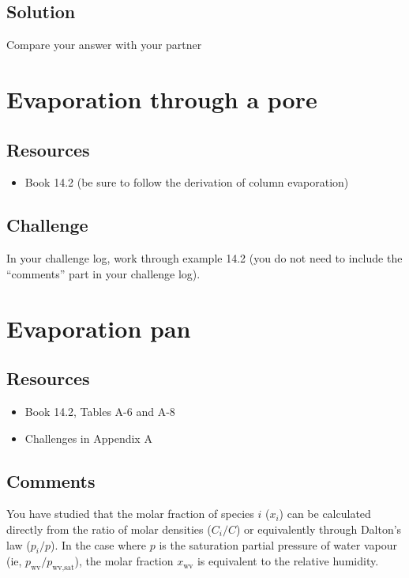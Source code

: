 \subsection*{Solution}
Compare your answer with your partner




\newpage
\section{Evaporation through a pore}

\subsection*{Resources}
\begin{itemize}
    \item Book 14.2 (be sure to follow the derivation of column evaporation)
\end{itemize}

\subsection*{Challenge}
In your challenge log, work through example 14.2 (you do not need to include the ``comments'' part in your challenge log).



\newpage
\section{Evaporation pan}

\subsection*{Resources}
\begin{itemize}
    \item Book 14.2, Tables A-6 and A-8
    \item Challenges in Appendix A
\end{itemize}

\subsection*{Comments}
You have studied that the molar fraction of species $i$ ($x_i$) can be calculated directly from the ratio of molar densities ($C_i/C$) or equivalently through Dalton's law ($p_i/p$). In the case where $p$ is the saturation partial pressure of water vapour (ie, $p_{\text{wv}}/p_{\text{wv},\text{sat}}$), the molar fraction $x_{\text{wv}}$ is equivalent to the relative humidity.

